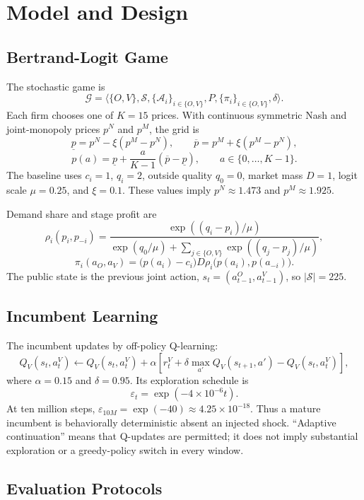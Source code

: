 \documentclass[11pt]{article}
\begin{document}
\section{Model and Design}

\subsection{Bertrand-Logit Game}

The stochastic game is
\[
\mathcal G=\langle \{O,V\},\mathcal S,\{\mathcal A_i\}_{i\in\{O,V\}},
P,\{\pi_i\}_{i\in\{O,V\}},\delta\rangle .
\]
Each firm chooses one of \(K=15\) prices. With continuous symmetric Nash and
joint-monopoly prices \(p^N\) and \(p^M\), the grid is
\[
\underline p=p^N-\xi(p^M-p^N),\qquad
\overline p=p^M+\xi(p^M-p^N),
\]
\[
p(a)=\underline p+\frac{a}{K-1}(\overline p-\underline p),
\qquad a\in\{0,\ldots,K-1\}.
\]
The baseline uses \(c_i=1\), \(q_i=2\), outside quality \(q_0=0\), market mass
\(D=1\), logit scale \(\mu=0.25\), and \(\xi=0.1\). These values imply
\(p^N\approx1.473\) and \(p^M\approx1.925\).

Demand share and stage profit are
\[
\rho_i(p_i,p_{-i})=
\frac{\exp((q_i-p_i)/\mu)}
{\exp(q_0/\mu)+\sum_{j\in\{O,V\}}\exp((q_j-p_j)/\mu)},
\]
\[
\pi_i(a_O,a_V)=
\bigl(p(a_i)-c_i\bigr)D
\rho_i\bigl(p(a_i),p(a_{-i})\bigr).
\]
The public state is the previous joint action,
\(s_t=(a^O_{t-1},a^V_{t-1})\), so \(|\mathcal S|=225\).

\subsection{Incumbent Learning}

The incumbent updates by off-policy Q-learning:
\[
Q_V(s_t,a^V_t)\leftarrow Q_V(s_t,a^V_t)+
\alpha\left[
r^V_t+\delta\max_{a'}Q_V(s_{t+1},a')-Q_V(s_t,a^V_t)
\right],
\]
where \(\alpha=0.15\) and \(\delta=0.95\). Its exploration schedule is
\[
\varepsilon_t=\exp(-4\times10^{-6}t).
\]
At ten million steps, \(\varepsilon_{10M}=\exp(-40)\approx4.25\times10^{-18}\).
Thus a mature incumbent is behaviorally deterministic absent an injected
shock. ``Adaptive continuation'' means that Q-updates are permitted; it does
not imply substantial exploration or a greedy-policy switch in every window.

\subsection{Evaluation Protocols}
\end{document}
